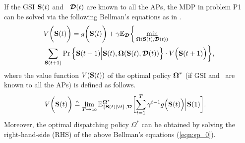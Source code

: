 If the GSI $\mathbf{S}(t)$ and \brlatency~$\boldsymbol{\mathcal{D}}(t)$ are known to all the APs, the MDP in problem P1 can be solved via the following Bellman's equations as in \cite{sutton1998}.
\begin{align}
    &V\bigg(\mathbf{S}(t)\bigg) =g\bigg(\mathbf{S}(t)\bigg)
        + \gamma\mathbb{E}_{\boldsymbol{\mathcal{D}}}\bigg\{
            \min_{\boldsymbol{\Omega}(\mathbf{S}(t),\boldsymbol{\mathcal{D}}(t))}
            \nonumber\\
            &\sum_{\mathbf{S}(t+1)} \Pr \Big\{ 
                \mathbf{S}(t+1) \Big| \mathbf{S}(t), \boldsymbol{\Omega}(\mathbf{S}(t), \boldsymbol{\mathcal{D}}(t)) \Big\} \cdot V\Big(\mathbf{S}(t+1)\Big)
            \bigg\},
    \label{eqn:sp_0}
\end{align}
where the value function $V(\mathbf{S}(t))$ of the optimal policy $\boldsymbol{\Omega}^{*}$ (if GSI and \brlatency~are known to all the APs) is defined as follows.
\begin{align}
    &V\Paren{\Stat(t)} \define
    \lim_{T\to\infty} 
    \mathbb{E}^{\Policy^*}_{\set{\Stat(t)|\forall t}, \Delay} \Bracket{
        \sum_{t=1}^{T} \gamma^{t-1} g\Big( \Stat(t) \Big) \Big| \Stat(1)
    }.
    \label{eqn:val_f}
\end{align}
Moreover, the optimal dispatching policy $\Omega^{*}$ can be obtained by solving the right-hand-side (RHS) of the above Bellman's equations (\ref{eqn:sp_0}).

